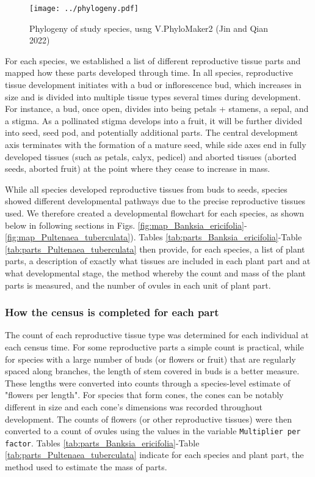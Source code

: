 \documentclass[10pt,twoside]{article}\usepackage[]{graphicx}\usepackage[]{color}
\begin{document}
\begin{figure}[h]
\centering
\texttt{[image: ../phylogeny.pdf]}
\caption{Phylogeny of study species, usng V.PhyloMaker2 (Jin and Qian 2022)}
\label{fig:phylogeny}
\end{figure}
\clearpage


For each species, we established a list of different reproductive tissue parts and mapped how these parts developed through time. In all species, reproductive tissue development initiates with a bud or inflorescence bud, which increases in size and is divided into multiple tissue types several times during development. For instance, a bud, once open, divides into being petals + stamens, a sepal, and a stigma. As a pollinated stigma develops into a fruit, it will be further divided into seed, seed pod, and potentially additional parts. The central development axis terminates with the formation of a mature seed, while side axes end in fully developed tissues (such as petals, calyx, pedicel) and aborted tissues (aborted seeds, aborted fruit) at the point where they cease to increase in mass.

While all species developed reproductive tissues from buds to seeds, species showed different developmental pathways due to the precise reproductive tissues used. We therefore created a developmental flowchart for each species, as shown below in following sections in Figs. \ref{fig:map_Banksia_ericifolia}-\ref{fig:map_Pultenaea_tuberculata}). Tables \ref{tab:parts_Banksia_ericifolia}-Table \ref{tab:parts_Pultenaea_tuberculata} then provide, for each species, a list of plant parts, a description of exactly what tissues are included in each plant part and at what developmental stage, the method whereby the count and mass of the plant parts is measured, and the number of ovules in each unit of plant part.

\subsubsection{How the census is completed for each part}

The count of each reproductive tissue type was determined for each individual at each census time. For some reproductive parts a simple count is practical, while for species with a large number of buds (or flowers or fruit) that are regularly spaced along branches, the length of stem covered in buds is a better measure. These lengths were converted into counts through a species-level estimate of "flowers per length". For species that form cones, the cones can be notably different in size and each cone's dimensions was recorded throughout development. The counts of flowers (or other reproductive tissues) were then converted to a count of ovules using the values in the variable \texttt{Multiplier per factor}. Tables \ref{tab:parts_Banksia_ericifolia}-Table \ref{tab:parts_Pultenaea_tuberculata} indicate for each species and plant part, the method used to estimate the mass of parts.
\end{document}
